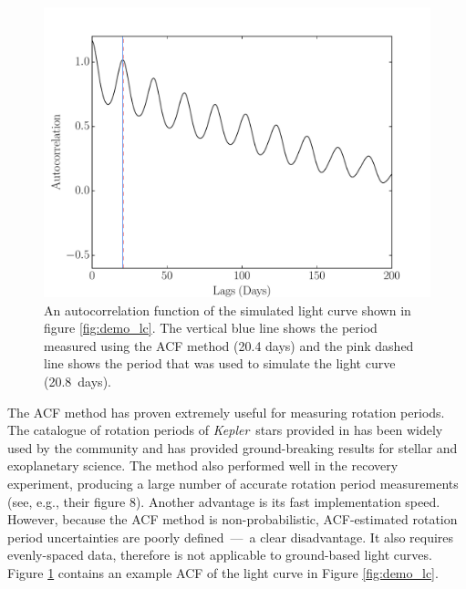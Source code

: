 \documentclass[a4paper,fleqn,usenatbib,useAMS]{mnras}
\newcommand{\Kepler}{{\it Kepler}}
\newcommand{\aigrainexampleperiod}{20.8}
\begin{document}
\begin{figure}
\begin{center}
\includegraphics[width=\columnwidth, clip=true]{figures/demo_ACF.pdf}
\caption[ACF of a simulated light curve.]
{An autocorrelation function of the simulated light curve shown in figure
\ref{fig:demo_lc}.
The vertical blue line shows the period measured using the ACF method (20.4
days) and the pink dashed line shows the period that was used to simulate the
light curve (\aigrainexampleperiod\ days).}
\label{fig:demo_acf}
\end{center}
\end{figure}

The ACF method has proven extremely useful for measuring rotation periods.
The catalogue of rotation periods of \Kepler\ stars provided in
\citet{Mcquillan2013} has been widely used by the community and has provided
ground-breaking results for stellar and exoplanetary science.
The method also performed well in the \citet{Aigrain2015}
recovery experiment,
producing a large number of accurate rotation period measurements
(see, e.g., their figure 8).
Another advantage is its fast implementation speed.
However, because the ACF method is non-probabilistic, ACF-estimated rotation
period uncertainties are poorly defined~---~a clear disadvantage.
It also requires evenly-spaced data, therefore is not applicable to
ground-based light curves.
Figure \ref{fig:demo_acf} contains an example ACF of the light curve in
Figure \ref{fig:demo_lc}.
\end{document}
